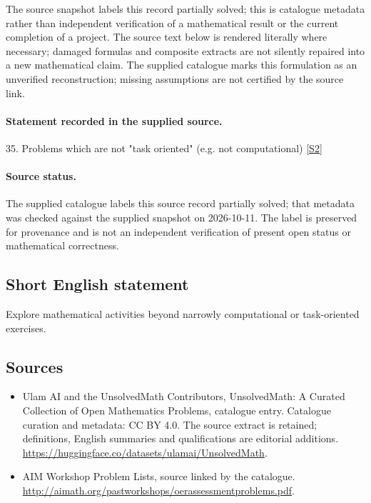 \documentclass[11pt]{article}
\begin{document}
The source snapshot labels this record partially solved; this is catalogue metadata rather than independent verification of a mathematical result or the current completion of a project.
The source text below is rendered literally where necessary; damaged formulas and composite extracts are not silently repaired into a new mathematical claim.
The supplied catalogue marks this formulation as an unverified reconstruction; missing assumptions are not certified by the source link.
\paragraph{Statement recorded in the supplied source.}
35. Problems which are not "task oriented" (e.g. not computational) \href{http://aimath.org/pastworkshops/oerassessmentproblems.pdf}{[S2]}
\paragraph{Source status.}
The supplied catalogue labels this source record partially solved; that metadata was checked against the supplied snapshot on 2026-10-11. The label is preserved for provenance and is not an independent verification of present open status or mathematical correctness.
\subsection{Short English statement}
Explore mathematical activities beyond narrowly computational or task-oriented exercises.
\subsection{Sources}
\begin{itemize}
\item[S1] Ulam AI and the UnsolvedMath Contributors, UnsolvedMath: A Curated Collection of Open Mathematics Problems, catalogue entry. Catalogue curation and metadata: CC BY 4.0. The source extract is retained; definitions, English summaries and qualifications are editorial additions.
\url{https://huggingface.co/datasets/ulamai/UnsolvedMath}.
\item[S2] AIM Workshop Problem Lists, source linked by the catalogue.
\url{http://aimath.org/pastworkshops/oerassessmentproblems.pdf}.
\end{itemize}
\end{document}
